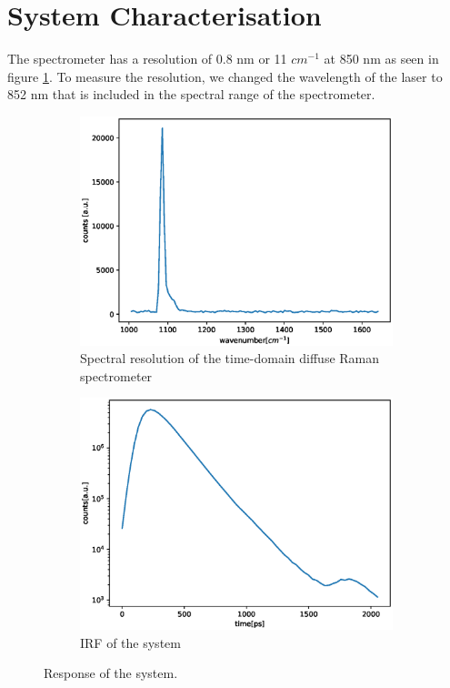 \documentclass{osa-article}
\begin{document}
\section{System Characterisation}
The spectrometer has a resolution of 0.8 nm or 11 $cm^{-1}$ at 850 nm as seen in figure \ref{fig:fwhm_spectra}.
To measure the resolution, we changed the wavelength of the laser to 852 nm that is included in the spectral range of the spectrometer. 
\begin{figure}
\begin{subfigure}{0.5\linewidth}
    \centering
    \includegraphics[scale = 0.4]{figure/fwhm_spectra.eps}
    \caption{Spectral resolution of the time-domain diffuse Raman spectrometer}
    \label{fig:fwhm_spectra}
\end{subfigure}
\begin{subfigure}{0.5\linewidth}
    \centering
    \includegraphics[scale = 0.4]{figure/time_domain_fwhm.eps}
    \caption{IRF of the system}
    \label{fig:td_fwhm}
\end{subfigure}
    \caption{Response of the system.}
\end{figure}
\end{document}
